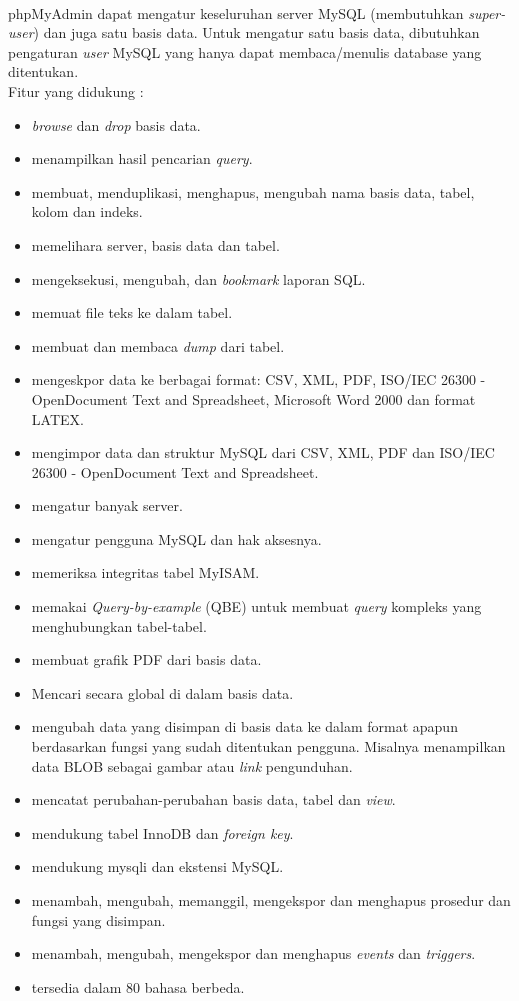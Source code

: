 \paragraph{} phpMyAdmin dapat mengatur keseluruhan server MySQL (membutuhkan \textit{super-user}) dan juga satu basis data. Untuk mengatur satu basis data, dibutuhkan pengaturan \textit{user} MySQL yang hanya dapat membaca/menulis database yang ditentukan.\cite{phpmyadmin:17} \\ 
Fitur yang didukung :
\begin{itemize}
	\item \textit{browse} dan \textit{drop} basis data.
	\item menampilkan hasil pencarian \textit{query}.
	\item membuat, menduplikasi, menghapus, mengubah nama basis data, tabel, kolom dan indeks.
	\item memelihara server, basis data dan tabel.
	\item mengeksekusi, mengubah, dan \textit{bookmark} laporan SQL.
	\item memuat file teks ke dalam tabel. \cite{phpmyadmin:17}
	\item membuat dan membaca \textit{dump} dari tabel.
	\item mengeskpor data ke berbagai format: CSV, XML, PDF, ISO/IEC 26300 - OpenDocument Text and Spreadsheet, Microsoft Word 2000 dan format LATEX.
	\item mengimpor data dan struktur MySQL dari CSV, XML, PDF dan ISO/IEC 26300 - OpenDocument Text and Spreadsheet.
	\item mengatur banyak server.
	\item mengatur pengguna MySQL dan hak aksesnya.
	\item memeriksa integritas tabel MyISAM.
	\item memakai \textit{Query-by-example }(QBE) untuk membuat \textit{query} kompleks yang menghubungkan tabel-tabel.
	\item membuat grafik PDF dari basis data.
	\item Mencari secara global di dalam basis data.
	\item mengubah data yang disimpan di basis data ke dalam format apapun berdasarkan fungsi yang sudah ditentukan pengguna. Misalnya menampilkan data BLOB sebagai gambar atau \textit{link} pengunduhan.
	\item mencatat perubahan-perubahan basis data, tabel dan \textit{view}.
	\item mendukung tabel InnoDB dan \textit{foreign key}. \cite{phpmyadmin:17}
	\item mendukung mysqli dan ekstensi MySQL.
	\item menambah, mengubah, memanggil, mengekspor dan menghapus prosedur dan fungsi yang disimpan.
	\item menambah, mengubah, mengekspor dan menghapus \textit{events} dan \textit{triggers}.
	\item tersedia dalam 80 bahasa berbeda.
\end{itemize}

